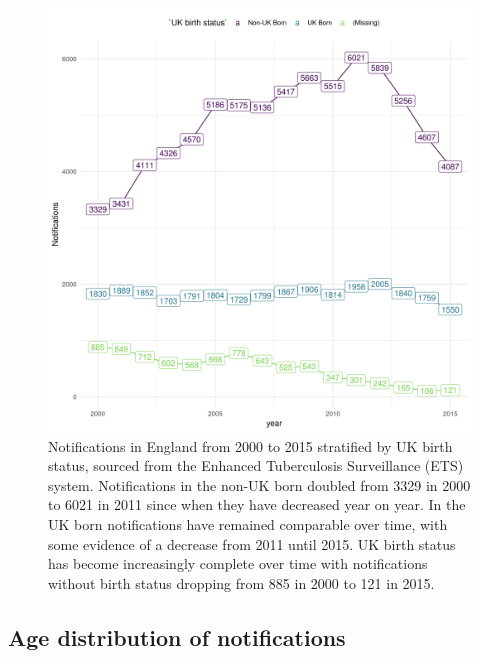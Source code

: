 \documentclass[11pt,twoside]{bristolthesis}
\begin{document}
  \begin{figure}
  
  {\centering \includegraphics[width=0.8\linewidth]{chapters/tb-epi-england/figures/plot-overall-nots} 
  
  }
  
  \caption{Notifications in England from 2000 to 2015 stratified by UK birth status, sourced from the Enhanced Tuberculosis Surveillance (ETS) system. Notifications in the non-UK born doubled from 3329 in 2000 to 6021 in 2011 since when they have decreased year on year. In the UK born notifications have remained comparable over time, with some evidence of a decrease from 2011 until 2015. UK birth status has become increasingly complete over time with notifications without birth status dropping from 885 in 2000 to 121 in 2015.}\label{fig:plot-overall-nots}
  \end{figure}
  \hypertarget{age-dist-nots}{%
  \subsection{Age distribution of notifications}\label{age-dist-nots}}
  
\end{document}
